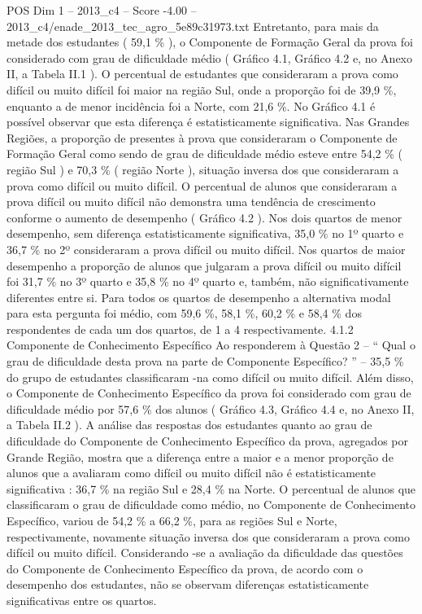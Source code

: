 \begin{textsample}{POS Dim 1 – 2013\_c4 – Score -4.00 – 2013\_c4/enade\_2013\_tec\_agro\_5e89c31973.txt}
Entretanto, para mais da metade dos estudantes ( 59,1 \% ), o Componente de Formação Geral da prova foi considerado com grau de dificuldade médio ( Gráfico 4.1, Gráfico 4.2 e, no Anexo II, a Tabela II.1 ).
O percentual de estudantes que consideraram a prova como difícil ou muito difícil foi maior na região Sul, onde a proporção foi de 39,9 \%, enquanto a de menor incidência foi a Norte, com 21,6 \%.
No Gráfico 4.1 é possível observar que esta diferença é estatisticamente significativa.
Nas Grandes Regiões, a proporção de presentes à prova que consideraram o Componente de Formação Geral como sendo de grau de dificuldade médio esteve entre 54,2 \% ( região Sul ) e 70,3 \% ( região Norte ), situação inversa dos que consideraram a prova como difícil ou muito difícil.
O percentual de alunos que consideraram a prova difícil ou muito difícil não demonstra uma tendência de crescimento conforme o aumento de desempenho ( Gráfico 4.2 ).
Nos dois quartos de menor desempenho, sem diferença estatisticamente significativa, 35,0 \% no 1º quarto e 36,7 \% no 2º consideraram a prova difícil ou muito difícil.
Nos quartos de maior desempenho a proporção de alunos que julgaram a prova difícil ou muito difícil foi 31,7 \% no 3º quarto e 35,8 \% no 4º quarto e, também, não significativamente diferentes entre si.
Para todos os quartos de desempenho a alternativa modal para esta pergunta foi médio, com 59,6 \%, 58,1 \%, 60,2 \% e 58,4 \% dos respondentes de cada um dos quartos, de 1 a 4 respectivamente. 4.1.2 Componente de Conhecimento Específico Ao responderem à Questão 2 – “ Qual o grau de dificuldade desta prova na parte de Componente Específico? ” – 35,5 \% do grupo de estudantes classificaram -na como difícil ou muito difícil.
Além disso, o Componente de Conhecimento Específico da prova foi considerado com grau de dificuldade médio por 57,6 \% dos alunos ( Gráfico 4.3, Gráfico 4.4 e, no Anexo II, a Tabela II.2 ).
A análise das respostas dos estudantes quanto ao grau de dificuldade do Componente de Conhecimento Específico da prova, agregados por Grande Região, mostra que a diferença entre a maior e a menor proporção de alunos que a avaliaram como difícil ou muito difícil não é estatisticamente significativa : 36,7 \% na região Sul e 28,4 \% na Norte.
O percentual de alunos que classificaram o grau de dificuldade como médio, no Componente de Conhecimento Específico, variou de 54,2 \% a 66,2 \%, para as regiões Sul e Norte, respectivamente, novamente situação inversa dos que consideraram a prova como difícil ou muito difícil.
Considerando -se a avaliação da dificuldade das questões do Componente de Conhecimento Específico da prova, de acordo com o desempenho dos estudantes, não se observam diferenças estatisticamente significativas entre os quartos.

\end{textsample}
